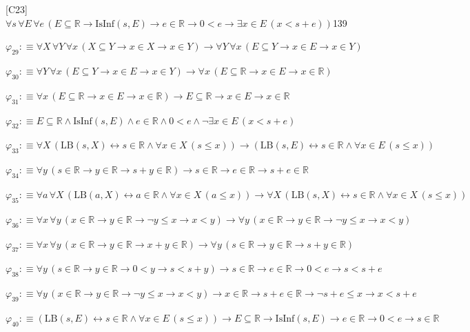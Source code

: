 \begin{fullproof}{[C23]}{$\forall s\,\forall E\,\forall e\,(E \subseteq \mathbb{R} \to \mathrm{IsInf}(s,E) \to e \in \mathbb{R} \to 0 < e \to \exists x \in E\,(x < s + e))$}{139}
\begin{abbrevlist}
\item $\varphi_{29} :\equiv \forall X\,\forall Y\,\forall x\,(X \subseteq Y \to x \in X \to x \in Y) \to \forall Y\,\forall x\,(E \subseteq Y \to x \in E \to x \in Y)$
\item $\varphi_{30} :\equiv \forall Y\,\forall x\,(E \subseteq Y \to x \in E \to x \in Y) \to \forall x\,(E \subseteq \mathbb{R} \to x \in E \to x \in \mathbb{R})$
\item $\varphi_{31} :\equiv \forall x\,(E \subseteq \mathbb{R} \to x \in E \to x \in \mathbb{R}) \to E \subseteq \mathbb{R} \to x \in E \to x \in \mathbb{R}$
\item $\varphi_{32} :\equiv E \subseteq \mathbb{R} \land \mathrm{IsInf}(s,E) \land e \in \mathbb{R} \land 0 < e \land \neg \exists x \in E\,(x < s + e)$
\item $\varphi_{33} :\equiv \forall X\,(\mathrm{LB}(s,X) \leftrightarrow s \in \mathbb{R} \land \forall x \in X\,(s \leq x)) \to (\mathrm{LB}(s,E) \leftrightarrow s \in \mathbb{R} \land \forall x \in E\,(s \leq x))$
\item $\varphi_{34} :\equiv \forall y\,(s \in \mathbb{R} \to y \in \mathbb{R} \to s + y \in \mathbb{R}) \to s \in \mathbb{R} \to e \in \mathbb{R} \to s + e \in \mathbb{R}$
\item $\varphi_{35} :\equiv \forall a\,\forall X\,(\mathrm{LB}(a,X) \leftrightarrow a \in \mathbb{R} \land \forall x \in X\,(a \leq x)) \to \forall X\,(\mathrm{LB}(s,X) \leftrightarrow s \in \mathbb{R} \land \forall x \in X\,(s \leq x))$
\item $\varphi_{36} :\equiv \forall x\,\forall y\,(x \in \mathbb{R} \to y \in \mathbb{R} \to \neg y \leq x \to x < y) \to \forall y\,(x \in \mathbb{R} \to y \in \mathbb{R} \to \neg y \leq x \to x < y)$
\item $\varphi_{37} :\equiv \forall x\,\forall y\,(x \in \mathbb{R} \to y \in \mathbb{R} \to x + y \in \mathbb{R}) \to \forall y\,(s \in \mathbb{R} \to y \in \mathbb{R} \to s + y \in \mathbb{R})$
\item $\varphi_{38} :\equiv \forall y\,(s \in \mathbb{R} \to y \in \mathbb{R} \to 0 < y \to s < s + y) \to s \in \mathbb{R} \to e \in \mathbb{R} \to 0 < e \to s < s + e$
\item $\varphi_{39} :\equiv \forall y\,(x \in \mathbb{R} \to y \in \mathbb{R} \to \neg y \leq x \to x < y) \to x \in \mathbb{R} \to s + e \in \mathbb{R} \to \neg s + e \leq x \to x < s + e$
\item $\varphi_{40} :\equiv (\mathrm{LB}(s,E) \leftrightarrow s \in \mathbb{R} \land \forall x \in E\,(s \leq x)) \to E \subseteq \mathbb{R} \to \mathrm{IsInf}(s,E) \to e \in \mathbb{R} \to 0 < e \to s \in \mathbb{R}$

\end{abbrevlist}
\end{fullproof}
